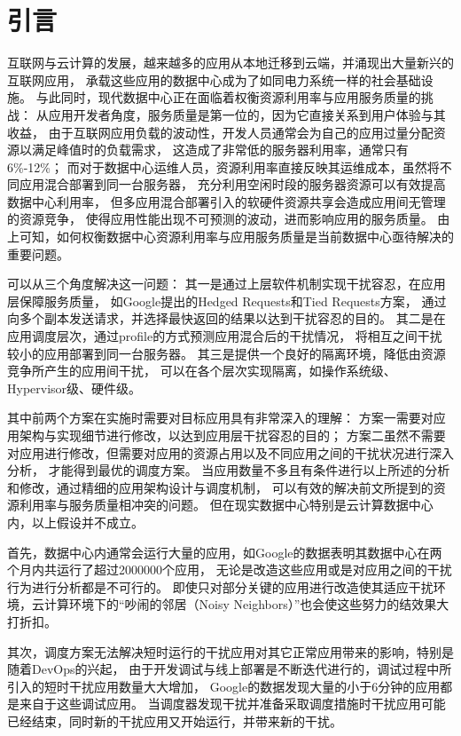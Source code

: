 

\chapter{引言}
\label{chap:intro}

互联网与云计算的发展，越来越多的应用从本地迁移到云端，并涌现出大量新兴的互联网应用，
承载这些应用的数据中心成为了如同电力系统一样的社会基础设施。
与此同时，现代数据中心正在面临着权衡资源利用率与应用服务质量的挑战：
从应用开发者角度，服务质量是第一位的，因为它直接关系到用户体验与其收益，
由于互联网应用负载的波动性，开发人员通常会为自己的应用过量分配资源以满足峰值时的负载需求，
这造成了非常低的服务器利用率，通常只有6\%-12\%；
而对于数据中心运维人员，资源利用率直接反映其运维成本，虽然将不同应用混合部署到同一台服务器，
充分利用空闲时段的服务器资源可以有效提高数据中心利用率，
但多应用混合部署引入的软硬件资源共享会造成应用间无管理的资源竞争，
使得应用性能出现不可预测的波动，进而影响应用的服务质量。
由上可知，如何权衡数据中心资源利用率与应用服务质量是当前数据中心亟待解决的重要问题。

可以从三个角度解决这一问题：
其一是通过上层软件机制实现干扰容忍，在应用层保障服务质量，
如Google提出的Hedged Requests和Tied Requests方案\cite{tailatscale2013}，
通过向多个副本发送请求，并选择最快返回的结果以达到干扰容忍的目的。
其二是在应用调度层次，通过profile的方式预测应用混合后的干扰情况，
将相互之间干扰较小的应用部署到同一台服务器。
其三是提供一个良好的隔离环境，降低由资源竞争所产生的应用间干扰，
可以在各个层次实现隔离，如操作系统级\cite{cgroup}、Hypervisor级\cite{}、硬件级\cite{}。

其中前两个方案在实施时需要对目标应用具有非常深入的理解：
方案一需要对应用架构与实现细节进行修改，以达到应用层干扰容忍的目的；
方案二虽然不需要对应用进行修改，但需要对应用的资源占用以及不同应用之间的干扰状况进行深入分析，
才能得到最优的调度方案。
当应用数量不多且有条件进行以上所述的分析和修改，通过精细的应用架构设计与调度机制，
可以有效的解决前文所提到的资源利用率与服务质量相冲突的问题。
但在现实数据中心特别是云计算数据中心内，以上假设并不成立。

首先，数据中心内通常会运行大量的应用，如Google的数据\cite{}表明其数据中心在两个月内共运行了超过2000000个应用，
无论是改造这些应用或是对应用之间的干扰行为进行分析都是不可行的。
即使只对部分关键的应用进行改造使其适应干扰环境，云计算环境下的“吵闹的邻居（Noisy Neighbors）”也会使这些努力的结效果大打折扣。

其次，调度方案无法解决短时运行的干扰应用对其它正常应用带来的影响，特别是随着DevOps的兴起，
由于开发调试与线上部署是不断迭代进行的，调试过程中所引入的短时干扰应用数量大大增加，
Google的数据\cite{}发现大量的小于6分钟的应用都是来自于这些调试应用。
当调度器发现干扰并准备采取调度措施时干扰应用可能已经结束，同时新的干扰应用又开始运行，并带来新的干扰。

